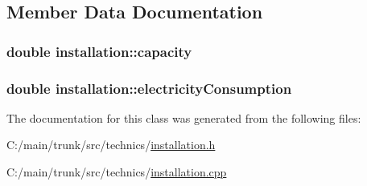 \subsection{Member Data Documentation}
\hypertarget{classinstallation_a3e2fecf0477097c93a07a04f064160d2}{
\subsubsection[{capacity}]{\setlength{\rightskip}{0pt plus 5cm}double {\bf installation::capacity}}}
\label{classinstallation_a3e2fecf0477097c93a07a04f064160d2}
\hypertarget{classinstallation_abc094c4812f1710da840a44362e81061}{
\subsubsection[{electricityConsumption}]{\setlength{\rightskip}{0pt plus 5cm}double {\bf installation::electricityConsumption}}}
\label{classinstallation_abc094c4812f1710da840a44362e81061}


The documentation for this class was generated from the following files:\begin{DoxyCompactItemize}
\item 
C:/main/trunk/src/technics/\hyperlink{installation_8h}{installation.h}\item 
C:/main/trunk/src/technics/\hyperlink{installation_8cpp}{installation.cpp}\end{DoxyCompactItemize}
